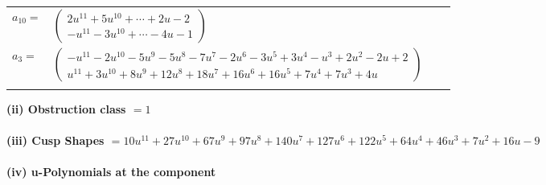 \documentclass[1p]{elsarticle_modified}
\theoremstyle{definition}
\begin{document}
\begin{tabular}{m{7pt} m{180pt} m{7pt} m{180pt} }
\flushright $a_{10}=$&$\begin{pmatrix}2 u^{11}+5 u^{10}+\cdots+2 u-2\\- u^{11}-3 u^{10}+\cdots-4 u-1\end{pmatrix}$ \\
\flushright $a_{3}=$&$\begin{pmatrix}- u^{11}-2 u^{10}-5 u^9-5 u^8-7 u^7-2 u^6-3 u^5+3 u^4- u^3+2 u^2-2 u+2\\u^{11}+3 u^{10}+8 u^9+12 u^8+18 u^7+16 u^6+16 u^5+7 u^4+7 u^3+4 u\end{pmatrix}$\\&\end{tabular}
\flushleft \textbf{(ii) Obstruction class $= 1$}\\~\\
\flushleft \textbf{(iii) Cusp Shapes $= 10 u^{11}+27 u^{10}+67 u^9+97 u^8+140 u^7+127 u^6+122 u^5+64 u^4+46 u^3+7 u^2+16 u-9$}\\~\\
\newpage\renewcommand{\arraystretch}{1}
\flushleft \textbf{(iv) u-Polynomials at the component}\newline \\
\end{document}
